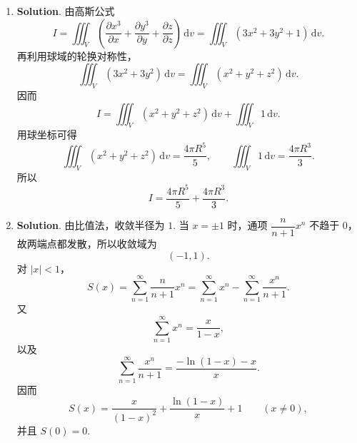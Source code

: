 \documentclass[../Main.tex]{subfiles}
\begin{document}
\begin{enumerate}
    \item \textbf{Solution}. 由高斯公式
          \[
              I=\iiint_V\left(\frac{\partial x^3}{\partial x}+\frac{\partial y^3}{\partial y}+\frac{\partial z}{\partial z}\right)\,\mathrm{d}v
              =\iiint_V(3x^2+3y^2+1)\,\mathrm{d}v.
          \]
          再利用球域的轮换对称性，
          \[
              \iiint_V(3x^2+3y^2)\,\mathrm{d}v=\iiint_V(x^2+y^2+z^2)\,\mathrm{d}v.
          \]
          因而
          \[
              I=\iiint_V(x^2+y^2+z^2)\,\mathrm{d}v+\iiint_V1\,\mathrm{d}v.
          \]
          用球坐标可得
          \[
              \iiint_V(x^2+y^2+z^2)\,\mathrm{d}v=\frac{4\pi R^5}{5},\qquad
              \iiint_V1\,\mathrm{d}v=\frac{4\pi R^3}{3}.
          \]
          所以
          \[
              I=\frac{4\pi R^5}{5}+\frac{4\pi R^3}{3}.
          \]

    \item \textbf{Solution}. 由比值法，收敛半径为 \(1\). 当 \(x=\pm1\) 时，通项 \(\dfrac{n}{n+1}x^n\) 不趋于 \(0\)，故两端点都发散，所以收敛域为
          \[
              (-1,1).
          \]
          对 \(|x|<1\)，
          \[
              S(x)=\sum_{n=1}^{\infty}\frac{n}{n+1}x^n
              =\sum_{n=1}^{\infty}x^n-\sum_{n=1}^{\infty}\frac{x^n}{n+1}.
          \]
          又
          \[
              \sum_{n=1}^{\infty}x^n=\frac{x}{1-x},
          \]
          以及
          \[
              \sum_{n=1}^{\infty}\frac{x^n}{n+1}
              =\frac{-\ln(1-x)-x}{x}.
          \]
          因而
          \[
              S(x)=\frac{x}{(1-x)^2}+\frac{\ln(1-x)}{x}+1\qquad (x\neq 0),
          \]
          并且 \(S(0)=0\).
\end{enumerate}
\end{document}
